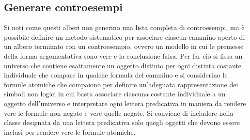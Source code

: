 \subsection{Generare controesempi}
Si noti come questi alberi non generino una lista completa di controesempi, ma \`e possibile definire un metodo sistematico per associare ciascun cammino aperto di un albero terminato con un controesempio, 
ovvero un modello in cui le premesse della forma argomentativa sono vere e la conclusione falsa. Per far ci\`o si fissa un universo che contiene esattamente un oggetto distinto per ogni distinta costante 
individuale che compare in qualche formula del cammino e si considerino le formule atomiche che compaiono per definire un'adeguata rappresentazione dei simboli non logici in cui basta associare ciascuna 
costante individuale a un oggetto dell'universo e interpretare ogni lettera predicativa in maniera da rendere vere le formule non negate e vere quelle negate. Si conviene di includere nella classe designata da una 
lettera predicativa solo quegli oggetti che devono essere inclusi per rendere vere le formule atomiche. 